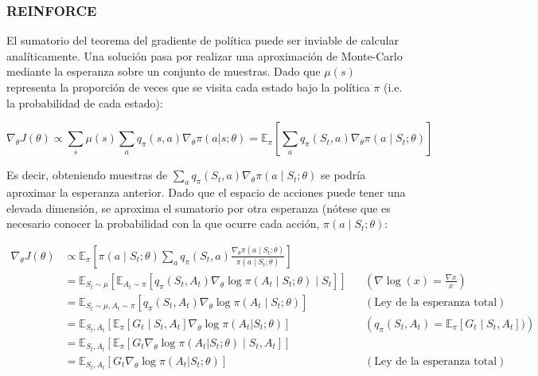 \documentclass[11pt,a4paper]{article}
\begin{document}
		\subsubsection{REINFORCE}
		El sumatorio del teorema del gradiente de política puede ser inviable de calcular analíticamente. Una solución pasa por realizar una aproximación de Monte-Carlo mediante la esperanza sobre un conjunto de muestras. Dado que $\mu(s)$ representa la proporción de veces que se visita cada estado bajo la política $\pi$ (i.e. la probabilidad de cada estado):
		
		\begin{equation}
		\nabla_\theta J(\theta) \propto \sum_s \mu(s) \sum_a q_\pi(s, a) \nabla_\theta \pi(a|s; \theta) = \mathbb{E}_{\pi}\left[ \sum_a q_\pi(S_t, a) \nabla_\theta \pi(a \mid S_t ; \theta) \right]
		\end{equation}
		
		Es decir, obteniendo muestras de $\sum_a q_\pi(S_t, a) \nabla_\theta \pi(a \mid S_t ; \theta)$ se podría aproximar la esperanza anterior. Dado que el espacio de acciones puede tener una elevada dimensión, se aproxima el sumatorio por otra esperanza (nótese que es necesario conocer la probabilidad con la que ocurre cada acción, $\pi(a \mid S_t ; \theta)$:
		
		\begin{align}
		\nabla_\theta J(\theta) &\propto \mathbb{E}_{\pi}\left[ \pi(a \mid S_t ; \theta) \sum_a q_\pi(S_t, a) \frac{\nabla_\theta \pi(a \mid S_t ; \theta)}{\pi(a \mid S_t ; \theta)} \right] \nonumber \\
		&= \mathbb{E}_{S_t \sim \mu}\left[ \mathbb{E}_{A_t \sim \pi} \left[q_\pi(S_t, A_t) \nabla_\theta \log \pi(A_t \mid S_t; \theta) \mid S_t \right] \right] && (\nabla \log(x) = \frac{\nabla x}{x}) \nonumber \\
		&= \mathbb{E}_{S_t \sim \mu, A_t \sim \pi}\left[ q_\pi(S_t, A_t) \nabla_\theta \log \pi(A_t \mid S_t; \theta) \right]  && (\text{Ley de la esperanza total}) \nonumber \\
		&= \mathbb{E}_{S_t, A_t} \left[ \mathbb{E}_\pi [ G_t \mid S_t, A_t ] \nabla_\theta \log \pi(A_t | S_t; \theta) \right] && \left(q_\pi(S_t, A_t) = \mathbb{E}_\pi[G_t \mid S_t, A_t]) \right) \nonumber \\
		&= \mathbb{E}_{S_t, A_t} \left[ \mathbb{E}_\pi [ G_t \nabla_\theta \log \pi(A_t | S_t; \theta) \mid S_t, A_t ] \right] \nonumber \\
		&= \mathbb{E}_{S_t, A_t} [ G_t \nabla_\theta \log \pi(A_t | S_t; \theta) ] && (\text{Ley de la esperanza total})
		\end{align}
		
\end{document}
